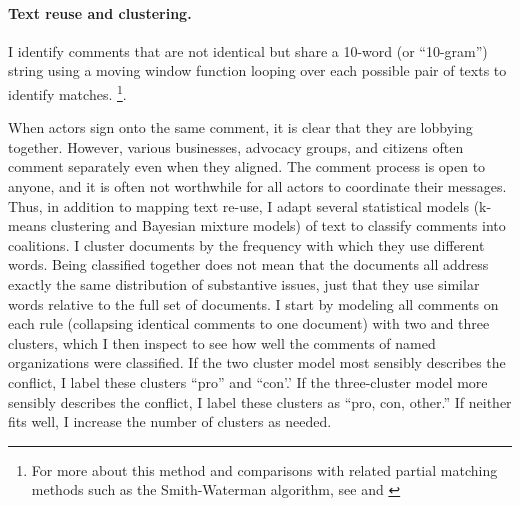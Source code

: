 \paragraph{Text reuse and clustering.} I identify comments that are not identical but share a 10-word (or ``10-gram'') string using a moving window function looping over each possible pair of texts to identify matches. \footnote{For more about this method and comparisons with related partial matching methods such as the Smith-Waterman algorithm, see \citet{Casas2017} and \citet{Judge-Lord2017}}.

When actors sign onto the same comment, it is clear that they are lobbying together. %
However, various businesses, advocacy groups, and citizens often comment separately even when they aligned. The comment process is open to anyone, and it is often not worthwhile for all actors to coordinate their messages. 
Thus, in addition to mapping text re-use, I adapt several statistical models (k-means clustering and Bayesian mixture models) of text to classify comments into coalitions. %
I cluster documents by the frequency with which they use different words. Being classified together does not mean that the documents all address exactly the same distribution of substantive issues, just that they use similar words relative to the full set of documents.
I start by modeling all comments on each rule (collapsing identical comments to one document) with two and three clusters, which I then inspect to see how well the comments of named organizations were classified. If the two cluster model most sensibly describes the conflict, I label these clusters ``pro'' and ``con'.' If the three-cluster model more sensibly describes the conflict, I label these clusters as ``pro, con, other.'' If neither fits well, I increase the number of clusters as needed. %

